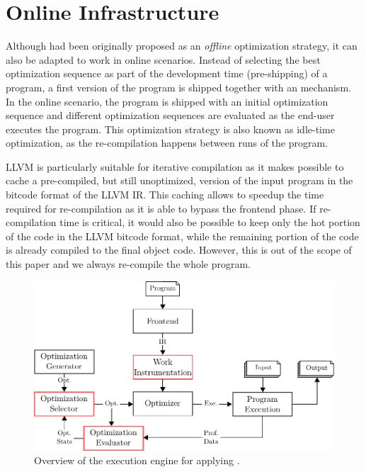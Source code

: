 \section{Online {\IterComp} Infrastructure} \label{sec:oic-infra}

Although {\itercomp} had been originally proposed as an \textit{offline} optimization strategy, it can also be adapted to work in online scenarios.
Instead of selecting the best optimization sequence as part of the development time (pre-shipping) of a program, a first version of the program is shipped together with an {\itercomp} mechanism.
In the online scenario, the program is shipped with an initial optimization sequence and different optimization sequences are evaluated as the end-user executes the program.
This optimization strategy is also known as idle-time optimization, as the re-compilation happens between runs of the program.

LLVM is particularly suitable for iterative compilation as it makes possible to cache a pre-compiled, but still unoptimized, version of the input program in the bitcode format of the LLVM IR.
This caching allows to speedup the time required for re-compilation as it is able to bypass the frontend phase.
If re-compilation time is critical, it would also be possible to keep only the hot portion of the code in the LLVM bitcode format, while the remaining portion of the code is already compiled to the final object code.
However, this is out of the scope of this paper and we always re-compile the whole program.

\begin{figure}[htb]
    \centering
    \includegraphics[width=\linewidth]{figs/infra-diagram}
    \caption{Overview of the execution engine for applying {\itercomp}.}
    \label{fig:infra-diagram}
\end{figure}

